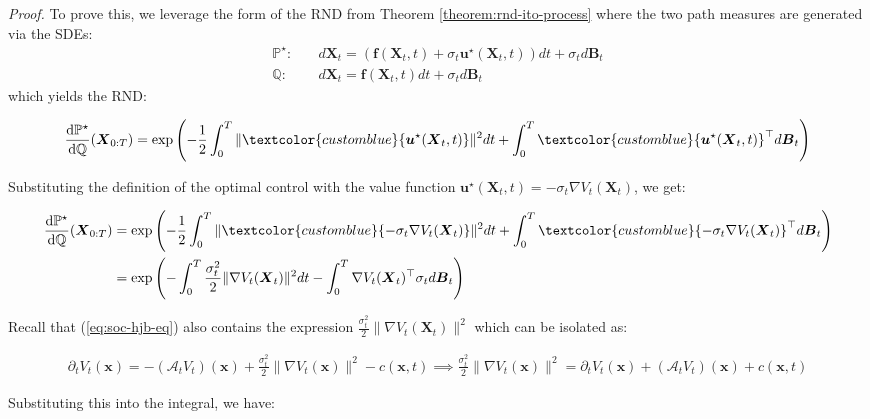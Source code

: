 \documentclass{article}
\newcommand{\bluetext}[1]{\textcolor{customblue}{#1}}
\begin{document}
\textit{Proof.} To prove this, we leverage the form of the RND from Theorem \ref{theorem:rnd-ito-process} where the two path measures are generated via the SDEs:
\begin{align}
    \mathbb{P}^\star:&\quad d\boldsymbol{X}_t=(\boldsymbol{f}(\boldsymbol{X}_t,t)+\sigma_t\boldsymbol{u}^\star(\boldsymbol{X}_t,t)) dt+ \sigma_td\boldsymbol{B}_t\\
    \mathbb{Q}:&\quad d \boldsymbol{X}_t=\boldsymbol{f}(\boldsymbol{X}_t,t)dt+ \sigma_td\boldsymbol{B}_t
\end{align}
which yields the RND:
\begin{small}
\begin{align}
    \frac{\mathrm{d}\mathbb{P}^\star}{\mathrm{d}\mathbb{Q}}(\boldsymbol{X}_{0:T})=\exp\left(-\frac{1}{2}\int_0^T\|\bluetext{\boldsymbol{u}^\star(\boldsymbol{X}_t,t)}\|^2dt+\int_0^T\bluetext{\boldsymbol{u}^\star(\boldsymbol{X}_t,t)}^\top d\boldsymbol{B}_t\right)
\end{align}
\end{small}
Substituting the definition of the optimal control with the value function $\boldsymbol{u}^\star(\boldsymbol{X}_t,t)=-\sigma_t\nabla V_t(\boldsymbol{X}_t)$, we get:
\begin{small}
\begin{align}
    \frac{\mathrm{d}\mathbb{P}^\star}{\mathrm{d}\mathbb{Q}}(\boldsymbol{X}_{0:T})&=\exp\left(-\frac{1}{2}\int_0^T\|\bluetext{-\sigma_t\nabla V_t(\boldsymbol{X}_t)}\|^2dt+\int_0^T\bluetext{-\sigma_t\nabla V_t(\boldsymbol{X}_t)}^\top d\boldsymbol{B}_t\right)\nonumber\\
    &=\exp\left(-\int_0^T\frac{\sigma_t^2}{2}\|\nabla V_t(\boldsymbol{X}_t)\|^2dt-\int_0^T\nabla V_t(\boldsymbol{X}_t)^\top \sigma_td\boldsymbol{B}_t\right)
\end{align}
\end{small}
Recall that (\ref{eq:soc-hjb-eq}) also contains the expression $\frac{\sigma_t^2}{2}\|\nabla V_t(\boldsymbol{X}_t)\|^2$ which can be isolated as:
\begin{small}
\begin{align}
    \partial_tV_t(\boldsymbol{x})=-(\mathcal{A}_tV_t)(\boldsymbol{x})+\frac{\sigma_t^2}{2}\|\nabla V_t(\boldsymbol{x})\|^2-c(\boldsymbol{x},t)\implies\frac{\sigma_t^2}{2}\|\nabla V_t(\boldsymbol{x})\|^2=\partial_tV_t(\boldsymbol{x})+(\mathcal{A}_tV_t)(\boldsymbol{x})+c(\boldsymbol{x},t)
\end{align}
\end{small}
Substituting this into the integral, we have:
\end{document}
